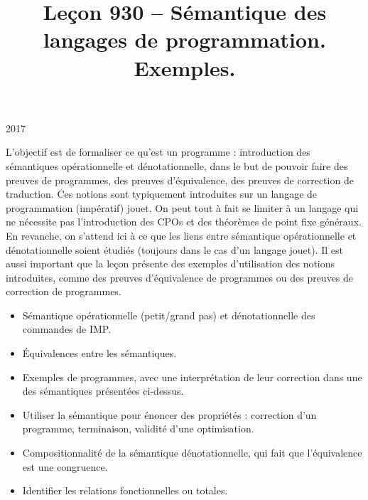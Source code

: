 \documentclass{agregfiche}
\title{Leçon 930 -- Sémantique des langages de programmation. Exemples.}
\begin{document}
\maketitle

\secrapports

\begin{rapport}{2017}

    L’objectif est de formaliser ce qu’est un programme : introduction des
    sémantiques opérationnelle et dénotationnelle, dans le but de pouvoir faire
    des preuves de programmes, des preuves d’équivalence, des preuves de
    correction de traduction. Ces notions sont typiquement introduites sur un
    langage de programmation (impératif) jouet. On peut tout à fait se limiter à
    un langage qui ne nécessite pas l’introduction des CPOs et des théorèmes de
    point fixe généraux. En revanche, on s’attend ici à ce que les liens entre
    sémantique opérationnelle et dénotationnelle soient étudiés (toujours dans le
    cas d’un langage jouet). Il est aussi important que la leçon présente des
    exemples d’utilisation des notions introduites, comme des preuves
    d’équivalence de programmes ou des preuves de correction de programmes.

\end{rapport}

\secindispensables

\begin{itemize}
    \item Sémantique opérationnelle (petit/grand pas) et dénotationnelle des commandes de IMP.
    \item Équivalences entre les
        sémantiques.
     \item Exemples de programmes, avec une interprétation de leur
     correction dans une des sémantiques présentées ci-dessus.
\end{itemize}

\secasavoir

\begin{itemize}
	\item Utiliser la sémantique pour énoncer des propriétés : correction d'un
	programme, terminaison, validité d'une optimisation.
    \item Compositionnalité de la sémantique dénotationnelle, qui fait que l'équivalence est une congruence.
    \item Identifier les relations fonctionnelles ou totales.
\end{itemize}

\secidees
\end{document}
